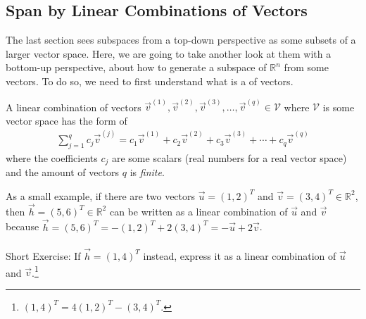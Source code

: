 \subsection{Span by Linear Combinations of Vectors}
\label{section:span}
The last section sees subspaces from a top-down perspective as some subsets of a larger vector space. Here, we are going to take another look at them with a bottom-up perspective, about how to generate a subspace of $\mathbb{R}^n$ from some vectors. To do so, we need to first understand what is a  of vectors.
\begin{defn}
\label{defn:linearcomb}
A linear combination of vectors $\vec{v}^{(1)}, \vec{v}^{(2)}, \vec{v}^{(3)}, \ldots, \vec{v}^{(q)} \in \mathcal{V}$ where $\mathcal{V}$ is some vector space has the form of
\begin{align*}
\sum_{j=1}^q c_j\vec{v}^{(j)} = c_1\vec{v}^{(1)} + c_2\vec{v}^{(2)} + c_3\vec{v}^{(3)} + \cdots + c_q\vec{v}^{(q)}
\end{align*}
where the coefficients $c_j$ are some scalars (real numbers for a real vector space) and the amount of vectors $q$ is \textit{finite}.
\end{defn}
As a small example, if there are two vectors $\vec{u} = (1,2)^T$ and $\vec{v} = (3,4)^T \in \mathbb{R}^2$, then $\vec{h} = (5,6)^T \in \mathbb{R}^2$ can be written as a linear combination of $\vec{u}$ and $\vec{v}$ because $\vec{h} = (5,6)^T = -(1,2)^T + 2(3,4)^T = -\vec{u} + 2\vec{v}$. \\
\\
Short Exercise: If $\vec{h} = (1,4)^T$ instead, express it as a linear combination of $\vec{u}$ and $\vec{v}$.\footnote{$(1,4)^T = 4(1,2)^T - (3,4)^T$.}\par

